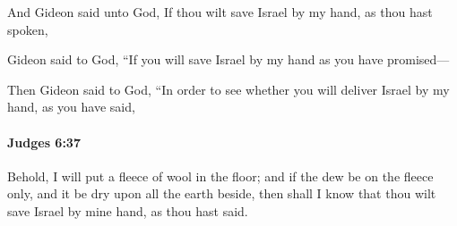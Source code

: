 			\begin{versebox}
					\item[BHS] 
					\item[ASV] And Gideon said unto God, If thou wilt save Israel by my hand, as thou hast spoken,
					\item[NIV] Gideon said to God, “If you will save Israel by my hand as you have promised—
					\item[NRSV] Then Gideon said to God, “In order to see whether you will deliver Israel by my hand, as you have said,
			\end{versebox}

		\paragraph{Judges 6:37} %
			\label{JUDGES-6-37}

			Behold, I will put a fleece of wool in the floor; and if the dew be on the fleece only, and it be dry upon all the earth beside, then shall I know that thou wilt save Israel by mine hand, as thou hast said.

